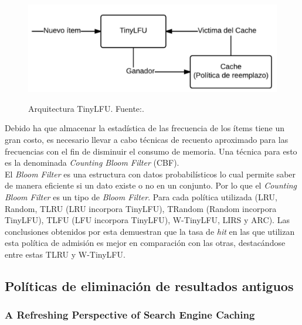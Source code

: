 \documentclass[12pt]{ociamthesis}  %
\begin{document}
\begin{figure}[!htb]
	\centering
	\includegraphics[width=12cm]{Imagenes/Politica_TinyLFU}\\
	\caption{Arquitectura TinyLFU. Fuente:.\cite{einziger2014tinylfu}}
	\label{clasificacion_consulta_cc_uc}
\end{figure}

Debido ha que almacenar la estadística de las frecuencia de los ítems tiene un gran costo, es necesario llevar a cabo técnicas de recuento aproximado para las frecuencias con el fin de disminuir el consumo de memoria. Una técnica para esto es la denominada \textit{Counting Bloom Filter} (CBF).\\

El \textit{Bloom Filter} es una estructura con datos probabilísticos lo cual permite saber de manera eficiente si un dato existe o no en un conjunto. Por lo que el \textit{Counting Bloom Filter} es un tipo de \textit{Bloom Filter}.
Para cada política utilizada (LRU, Random, TLRU (LRU incorpora TinyLFU), TRandom (Random incorpora TinyLFU), TLFU (LFU incorpora TinyLFU), W-TinyLFU, LIRS y ARC). Las conclusiones obtenidos por esta demuestran que la tasa de \textit{hit} en las que utilizan esta política de admisión es mejor en comparación con las otras, destacándose entre estas TLRU y W-TinyLFU.\\
 

\subsection{Políticas de eliminación de resultados antiguos}

\subsubsection{A Refreshing Perspective of Search Engine Caching}






\end{document}

